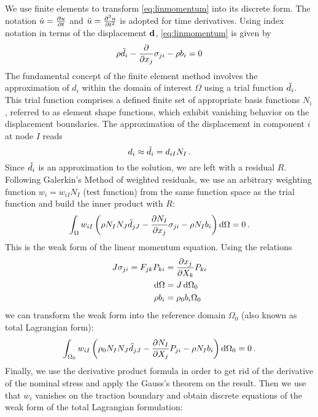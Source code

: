 We use finite elements to transform \autoref{eq:linmomentum} into its discrete form.
The notation $\dot{u} = \pdv{u}{t}$ and $\Ddot{u} = \pdv[2]{u}{t}$ is adopted for time derivatives.
Using index notation in terms of the displacement $\d$, \autoref{eq:linmomentum} is given by 
\begin{equation}
    \rho \Ddot{d}_i- \pdv{}{x_j}\sigma_{ji} - \rho b_i = 0
\end{equation}
The fundamental concept of the finite element method involves the approximation of $d_i$ within the domain of interest $\Omega$ using a trial function $\Tilde{d}_i$. 
This trial function comprises a defined finite set of appropriate basis functions $N_i$, referred to as element shape functions, which exhibit vanishing behavior on the displacement boundaries.
The approximation of the displacement in component $i$ at node $I$ reads
\begin{equation}
    d_i \approx \Tilde{d}_i = d_{iI} N_I \,.
\end{equation}
Since $\Tilde{d}_i$ is an approximation to the solution, we are left with a residual $R$.
Following Galerkin's Method of weighted residuals, we use an arbitrary weighting function $w_i = w_{iI} N_I$ (test function) from the same function space as the trial function and build the inner product with $R$:
\begin{equation}
    \int_\Omega w_{iI} \left( \rho N_I N_J \Ddot{d}_{jJ} - \pdv{N_I}{x_j} \sigma_{ji} -\rho N_I b_i \right) \dd{\Omega} = 0 \,.
\end{equation}
This is the weak form of the linear momentum equation.
Using the relations 
\begin{align*}
    J \sigma_{ji} = F_{jk} P_{ki} &= \pdv{x_j}{X_k} P_{ki} \\
    \dd{\Omega} &= J \dd{\Omega_0} \\
    \rho b_i &= \rho_0 b_i \Omega_0
\end{align*}
we can transform the weak form into the reference domain $\Omega_0$ (also known as total Lagrangian form):
\begin{equation}
    \int_{\Omega_0} w_{iI} \left( \rho_0 N_I N_J \Ddot{d}_{jJ} - \pdv{N_I}{X_j} P_{ji} -\rho N_I b_i \right) \dd{\Omega_0} = 0 \,.
\end{equation}
Finally, we use the derivative product formula in order to get rid of the derivative of the nominal stress and apply the Gauss’s theorem on the result. 
Then we use that $w_i$ vanishes on the traction boundary and obtain discrete equations of the weak form of the total Lagrangian formulation:
